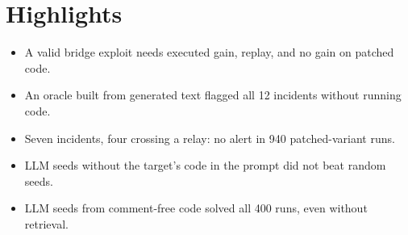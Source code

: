 \documentclass{article}
\begin{document}
\section*{Highlights}

\begin{itemize}
\item A valid bridge exploit needs executed gain, replay, and no gain on patched code.
\item An oracle built from generated text flagged all 12 incidents without running code.
\item Seven incidents, four crossing a relay: no alert in 940 patched-variant runs.
\item LLM seeds without the target's code in the prompt did not beat random seeds.
\item LLM seeds from comment-free code solved all 400 runs, even without retrieval.
\end{itemize}
\end{document}
